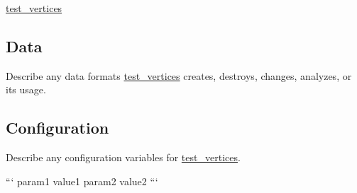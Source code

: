 \hyperlink{classtest__vertices}{test\-\_\-vertices}

\subsection*{Data}

Describe any data formats \hyperlink{classtest__vertices}{test\-\_\-vertices} creates, destroys, changes, analyzes, or its usage.

\subsection*{Configuration}

Describe any configuration variables for \hyperlink{classtest__vertices}{test\-\_\-vertices}.

``` param1 value1 param2 value2 ``` 